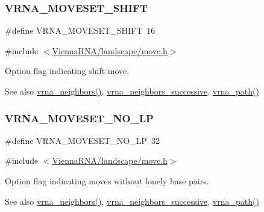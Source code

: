 \subsubsection{\texorpdfstring{VRNA\_MOVESET\_SHIFT}{VRNA\_MOVESET\_SHIFT}}
{\footnotesize\ttfamily \#define V\+R\+N\+A\+\_\+\+M\+O\+V\+E\+S\+E\+T\+\_\+\+S\+H\+I\+FT~16}



{\ttfamily \#include $<$\mbox{\hyperlink{move_8h}{Vienna\+R\+N\+A/landscape/move.\+h}}$>$}



Option flag indicating shift move. 

\begin{DoxySeeAlso}{See also}
\mbox{\hyperlink{group__neighbors_ga4f8eefae08c05f5a49a4d4ee5d02e32f}{vrna\+\_\+neighbors()}}, \mbox{\hyperlink{group__neighbors_gae5aaa1c5a1f22e889843f3edbdd04714}{vrna\+\_\+neighbors\+\_\+successive}}, \mbox{\hyperlink{group__paths__walk_gaef7afadc36933b80706de49fe36e7b94}{vrna\+\_\+path()}} 
\end{DoxySeeAlso}
\mbox{\label{group__neighbors_ga258084b251b218fba9398826435a4393}} 
\subsubsection{\texorpdfstring{VRNA\_MOVESET\_NO\_LP}{VRNA\_MOVESET\_NO\_LP}}
{\footnotesize\ttfamily \#define V\+R\+N\+A\+\_\+\+M\+O\+V\+E\+S\+E\+T\+\_\+\+N\+O\+\_\+\+LP~32}



{\ttfamily \#include $<$\mbox{\hyperlink{move_8h}{Vienna\+R\+N\+A/landscape/move.\+h}}$>$}



Option flag indicating moves without lonely base pairs. 

\begin{DoxySeeAlso}{See also}
\mbox{\hyperlink{group__neighbors_ga4f8eefae08c05f5a49a4d4ee5d02e32f}{vrna\+\_\+neighbors()}}, \mbox{\hyperlink{group__neighbors_gae5aaa1c5a1f22e889843f3edbdd04714}{vrna\+\_\+neighbors\+\_\+successive}}, \mbox{\hyperlink{group__paths__walk_gaef7afadc36933b80706de49fe36e7b94}{vrna\+\_\+path()}} 
\end{DoxySeeAlso}
\mbox{\label{group__neighbors_gaa5ffec4dd0d02df320f123e6888154d1}} 
